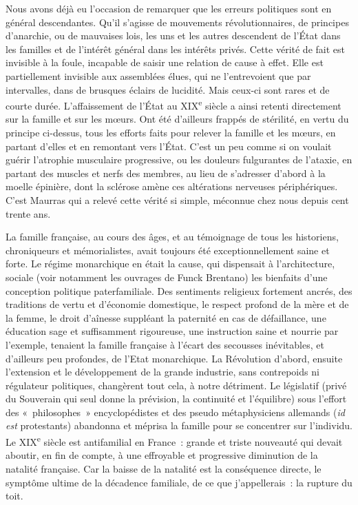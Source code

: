 \documentclass[french,twoside]{book} %
\newcommand\chaptercont{} %
\begin{document}
\chaptercont
\noindent Nous avons déjà eu l’occasion de remarquer que les erreurs politiques sont en général descendantes. Qu’il s’agisse de mouvements révolutionnaires, de principes d’anarchie, ou de mauvaises lois, les uns et les autres descendent de l’État dans les familles et de l’intérêt général dans les intérêts privés. Cette vérité de fait est invisible à la foule, incapable de saisir une relation de cause à effet. Elle est partiellement invisible aux assemblées élues, qui ne l’entrevoient que par intervalles, dans de brusques éclairs de lucidité. Mais ceux-ci sont rares et de courte durée. L’affaissement de l’État au XIX\textsuperscript{e} siècle a ainsi retenti directement sur la famille et sur les mœurs. Ont été d’ailleurs frappés de stérilité, en vertu du principe ci-dessus, tous les efforts faits pour relever la famille et les mœurs, en partant d’elles et en remontant vers l’État. C’est un peu comme si on voulait guérir l’atrophie musculaire progressive, ou les douleurs fulgurantes de l’ataxie, en partant des muscles et nerfs des membres, au lieu de s’adresser d’abord à la moelle épinière, dont la sclérose amène ces altérations nerveuses périphériques. C’est Maurras qui a relevé cette vérité si simple, méconnue chez nous depuis cent trente ans.\par
La famille française, au cours des âges, et au témoignage de tous les historiens, chroniqueurs et mémorialistes, avait toujours été exceptionnellement saine et forte. Le régime monarchique en était la cause, qui dispensait à l’architecture, sociale (voir notamment les ouvrages de Funck Brentano) les bienfaits d’une conception politique paterfamiliale. Des sentiments religieux fortement ancrés, des traditions de vertu et d’économie domestique, le respect profond de la mère et de la femme, le droit d’aînesse suppléant la paternité en cas de défaillance, une éducation sage et suffisamment rigoureuse, une instruction saine et nourrie par l’exemple, tenaient la famille française à l’écart des secousses inévitables, et d’ailleurs peu profondes, de l’Etat monarchique. La Révolution d’abord, ensuite l’extension et le développement de la grande industrie, sans contrepoids ni régulateur politiques, changèrent tout cela, à notre détriment. Le législatif (privé du Souverain qui seul donne la prévision, la continuité et l’équilibre) sous l’effort des « philosophes » encyclopédistes et des pseudo métaphysiciens allemands ({\itshape id est} protestants) abandonna et méprisa la famille pour se concentrer sur l’individu. Le XIX\textsuperscript{e} siècle est antifamilial en France : grande et triste nouveauté qui devait aboutir, en fin de compte, à une effroyable et progressive diminution de la natalité française. Car la baisse de la natalité est la conséquence directe, le symptôme ultime de la décadence familiale, de ce que j’appellerais : la rupture du toit.\par
\end{document}
